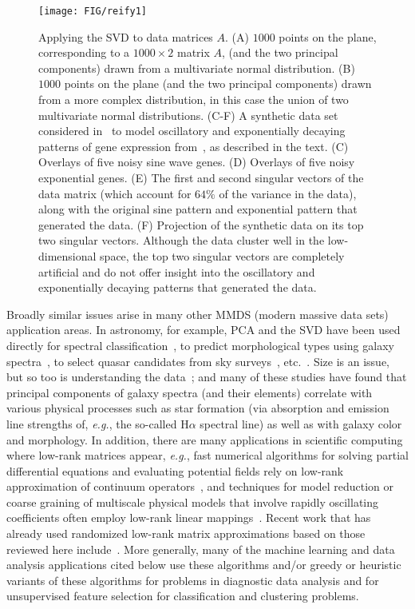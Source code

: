 \documentclass[twoside]{article}
\begin{document}
\begin{figure}
\begin{center}
\texttt{[image: FIG/reify1]}
\caption{Applying the SVD to data matrices $A$.
(A) $1000$ points on the plane, corresponding to a $1000 \times 2$ matrix $A$, 
(and the two principal components) drawn from a multivariate normal 
distribution.
(B) $1000$ points on the plane (and the two principal components) drawn from a 
more complex distribution, in this case the union of two multivariate normal 
distributions.
(C-F) A synthetic data set considered in~\cite{WRR03} to model 
oscillatory and exponentially decaying patterns of gene expression 
from~\cite{Cho_cellcycle_98}, as described in the text.
(C) Overlays of five noisy sine wave genes.
(D) Overlays of five noisy exponential genes.
(E) The first and second singular vectors of the data matrix (which account for 
$64\%$ of the variance in the data), along with the original sine pattern and 
exponential pattern that generated the data.
(F) Projection of the synthetic data on its top two singular vectors.
Although the data cluster well in the low-dimensional space, the top two 
singular vectors are completely artificial and do not offer insight into the 
oscillatory and exponentially decaying patterns that generated the data.}
\label{fig:hardcorepicture}
\end{center}
\end{figure}

Broadly similar issues arise in many other MMDS (modern massive data sets) application areas.  
In astronomy, for example, PCA and the SVD have been used directly for 
spectral classification~\cite{CSBKC95,CS99,MLTT01,YCSetc04}, 
to predict morphological types using galaxy spectra~\cite{FLM96}, 
to select quasar candidates from sky surveys~\cite{YCVetc04}, 
etc.~\cite{BLFetc04,BWSDY09,MKI10,BL10}.
Size is an issue, but so too is understanding the data~\cite{BDPS02,BB10}; 
and many of these studies have found that principal components of galaxy 
spectra (and their elements) correlate with various physical processes such 
as star formation (via absorption and emission line strengths of, 
\emph{e.g.}, the so-called H$\alpha$ spectral line) as well as with galaxy color and morphology.
In addition, there are many applications in scientific computing where 
low-rank matrices appear, \emph{e.g.}, fast numerical algorithms for solving
partial differential equations and evaluating potential fields rely on 
low-rank approximation of continuum operators~\cite{GR97,GH03}, and 
techniques for model reduction or coarse graining of multiscale physical 
models that involve rapidly oscillating coefficients often employ low-rank 
linear mappings~\cite{Engquist01}.
Recent work that has already used randomized low-rank matrix approximations
based on those reviewed here 
include~\cite{CDY07_JRNL,EY07,Mar08_TR,LLY11,LYMLYE11,CB10_DRAFT}.
More generally, many of the machine learning and data analysis applications 
cited below use these algorithms and/or greedy or heuristic variants of 
these algorithms for problems in diagnostic data analysis and for 
unsupervised feature selection for classification and clustering problems.
\end{document}
